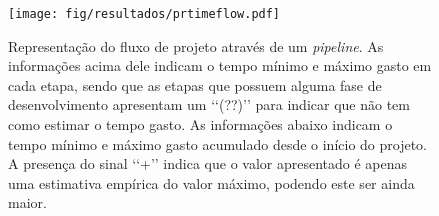 \documentclass[11pt,a4paper,oneside]{book}
\begin{document}
\begin{figure}[htp]
\centering
\texttt{[image: fig/resultados/prtimeflow.pdf]}
\caption{Representação do fluxo de projeto através de um \textit{pipeline}. As informações acima dele indicam o tempo mínimo e máximo gasto em cada etapa, sendo que as etapas que possuem alguma fase de desenvolvimento apresentam um \lq\lq{}(??)\rq\rq{} para indicar que não tem como estimar o tempo gasto. As informações abaixo indicam o tempo mínimo e máximo gasto acumulado desde o início do projeto. A presença do sinal \lq\lq{}+\rq\rq{} indica que o valor apresentado é apenas uma estimativa empírica do valor máximo, podendo este ser ainda maior.}
\label{fig:res:prtimeflow}
\end{figure}

\ifx\compilewholereport\undefined
	
	\newsavebox\mytempbib\savebox\mytempbib{\parbox{\textwidth}{}}

	\listoftodos
	
\end{document}
